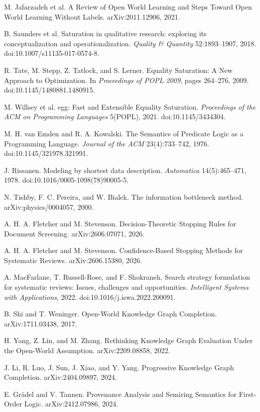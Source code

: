  M. Jafarzadeh et al. A Review of Open World Learning and Steps Toward Open World Learning Without Labels. arXiv:2011.12906, 2021.

 B. Saunders et al. Saturation in qualitative research: exploring its conceptualization and operationalization. \emph{Quality \& Quantity} 52:1893--1907, 2018. doi:10.1007/s11135-017-0574-8.

 R. Tate, M. Stepp, Z. Tatlock, and S. Lerner. Equality Saturation: A New Approach to Optimization. In \emph{Proceedings of POPL 2009}, pages 264--276, 2009. doi:10.1145/1480881.1480915.

 M. Willsey et al. egg: Fast and Extensible Equality Saturation. \emph{Proceedings of the ACM on Programming Languages} 5(POPL), 2021. doi:10.1145/3434304.

 M. H. van Emden and R. A. Kowalski. The Semantics of Predicate Logic as a Programming Language. \emph{Journal of the ACM} 23(4):733--742, 1976. doi:10.1145/321978.321991.

 J. Rissanen. Modeling by shortest data description. \emph{Automatica} 14(5):465--471, 1978. doi:10.1016/0005-1098(78)90005-5.

 N. Tishby, F. C. Pereira, and W. Bialek. The information bottleneck method. arXiv:physics/0004057, 2000.

 A. H. A. Fletcher and M. Stevenson. Decision-Theoretic Stopping Rules for Document Screening. arXiv:2606.07071, 2026.

 A. H. A. Fletcher and M. Stevenson. Confidence-Based Stopping Methods for Systematic Reviews. arXiv:2606.15380, 2026.

 A. MacFarlane, T. Russell-Rose, and F. Shokraneh. Search strategy formulation for systematic reviews: Issues, challenges and opportunities. \emph{Intelligent Systems with Applications}, 2022. doi:10.1016/j.iswa.2022.200091.

 B. Shi and T. Weninger. Open-World Knowledge Graph Completion. arXiv:1711.03438, 2017.

 H. Yang, Z. Lin, and M. Zhang. Rethinking Knowledge Graph Evaluation Under the Open-World Assumption. arXiv:2209.08858, 2022.

 J. Li, R. Luo, J. Sun, J. Xiao, and Y. Yang. Progressive Knowledge Graph Completion. arXiv:2404.09897, 2024.

 E. Gr\"adel and V. Tannen. Provenance Analysis and Semiring Semantics for First-Order Logic. arXiv:2412.07986, 2024.
